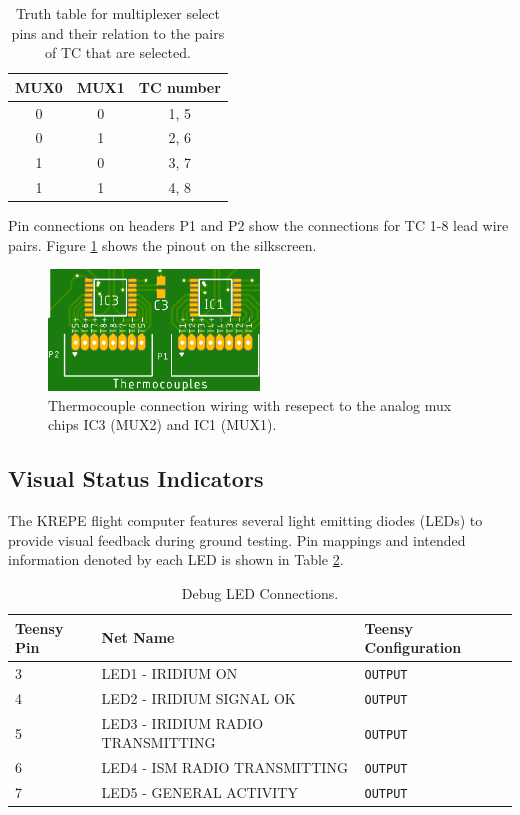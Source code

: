 \documentclass{article}
\begin{document}
\begin{table}[H]
  \centering
  \caption{Truth table for multiplexer select pins and their relation to the pairs of TC that are selected.}
  \label{tab:tc-mux-sel}
  \begin{tabular}{c | c | c}
    MUX0 & MUX1 & TC number \\
    \hline
    0 & 0 & 1, 5 \\
    0 & 1 & 2, 6 \\
    1 & 0 & 3, 7 \\
    1 & 1 & 4, 8
  \end{tabular}
\end{table}
%
Pin connections on headers P1 and P2 show the connections for TC 1-8 lead wire pairs. Figure \ref{fig:tc-conn} shows the pinout on the silkscreen.
%
\begin{figure}[H]
    \centering
    \includegraphics[width=0.5\textwidth]{images/krepe-thermocouples.png}
    \caption{Thermocouple connection wiring with resepect to the analog mux chips IC3 (MUX2) and IC1 (MUX1).}
    \label{fig:tc-conn}
\end{figure}


\subsection{Visual Status Indicators}
The KREPE flight computer features several light emitting diodes (LEDs) to provide visual feedback during ground testing. Pin mappings and intended information denoted by each LED is shown in Table \ref{tab:pins_leds}.
\begin{table}[H]
	\centering
	\caption{Debug LED Connections.}
	\label{tab:pins_leds}
	\begin{tabular}{l|l|l}
		Teensy Pin & Net Name     & Teensy Configuration \\
		\hline 
		3 & LED1 - IRIDIUM ON        &   \texttt{OUTPUT}\\
		4 & LED2 - IRIDIUM SIGNAL OK       &   \texttt{OUTPUT}\\
		5 & LED3 - IRIDIUM RADIO TRANSMITTING       &   \texttt{OUTPUT}\\
		6 & LED4 - ISM RADIO TRANSMITTING       &   \texttt{OUTPUT}\\
		7 & LED5 - GENERAL ACTIVITY       &   \texttt{OUTPUT}
	\end{tabular}
\end{table}
\end{document}
